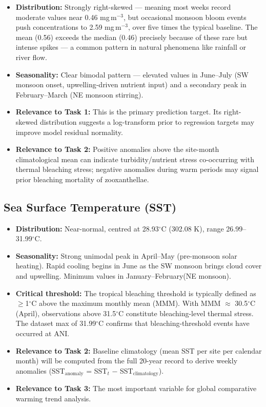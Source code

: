 \documentclass[12pt,a4paper]{report}
\begin{document}
\begin{itemize}[leftmargin=*]
  \item \textbf{Distribution:} Strongly right-skewed — meaning most weeks record
    moderate values near 0.46 mg\,m$^{-3}$, but occasional monsoon bloom events push
    concentrations to 2.59 mg\,m$^{-3}$, over five times the typical baseline.
    The mean (0.56) exceeds the median (0.46) precisely because of these rare but
    intense spikes — a common pattern in natural phenomena like rainfall or river flow.
  \item \textbf{Seasonality:} Clear bimodal pattern — elevated values in June--July
    (SW monsoon onset, upwelling-driven nutrient input) and a secondary peak in
    February--March (NE monsoon stirring).
  \item \textbf{Relevance to Task 1:} This is the primary prediction target. Its
    right-skewed distribution suggests a log-transform prior to regression targets
    may improve model residual normality.
  \item \textbf{Relevance to Task 2:} Positive anomalies above the site-month
    climatological mean can indicate turbidity/nutrient stress co-occurring with
    thermal bleaching stress; negative anomalies during warm periods may signal
    prior bleaching mortality of zooxanthellae.
\end{itemize}

\subsection{Sea Surface Temperature (SST)}

\begin{itemize}[leftmargin=*]
  \item \textbf{Distribution:} Near-normal, centred at 28.93$^\circ$C (302.08 K),
    range 26.99--31.99$^\circ$C.
  \item \textbf{Seasonality:} Strong unimodal peak in April--May (pre-monsoon solar
    heating). Rapid cooling begins in June as the SW monsoon brings cloud cover and
    upwelling. Minimum values in January--February(NE monsoon).
  \item \textbf{Critical threshold:} The tropical bleaching threshold is typically
    defined as $\geq$1$^\circ$C above the maximum monthly mean (MMM). With MMM
    $\approx$ 30.5$^\circ$C (April), observations above 31.5$^\circ$C constitute
    bleaching-level thermal stress. The dataset max of 31.99$^\circ$C confirms that
    bleaching-threshold events have occurred at ANI.
  \item \textbf{Relevance to Task 2:} Baseline climatology (mean SST per site per
    calendar month) will be computed from the full 20-year record to derive weekly
    anomalies (SST$_{\text{anomaly}}$ = SST$_t$ $-$ SST$_{\text{climatology}}$).
  \item \textbf{Relevance to Task 3:} The most important variable for global
    comparative warming trend analysis.
\end{itemize}
\end{document}
